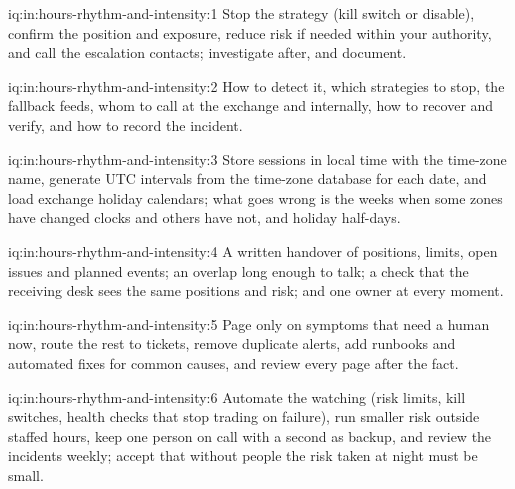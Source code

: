\begin{solution}{iq:in:hours-rhythm-and-intensity:1}
Stop the strategy (kill switch or disable), confirm the position and exposure, reduce risk if needed within your
authority, and call the escalation contacts; investigate after, and document.
\end{solution}

\begin{solution}{iq:in:hours-rhythm-and-intensity:2}
How to detect it, which strategies to stop, the fallback feeds, whom to call at the exchange and internally, how to
recover and verify, and how to record the incident.
\end{solution}

\begin{solution}{iq:in:hours-rhythm-and-intensity:3}
Store sessions in local time with the time-zone name, generate UTC intervals from the time-zone database for each date,
and load exchange holiday calendars; what goes wrong is the weeks when some zones have changed clocks and others have not,
and holiday half-days.
\end{solution}

\begin{solution}{iq:in:hours-rhythm-and-intensity:4}
A written handover of positions, limits, open issues and planned events; an overlap long enough to talk; a check that the
receiving desk sees the same positions and risk; and one owner at every moment.
\end{solution}

\begin{solution}{iq:in:hours-rhythm-and-intensity:5}
Page only on symptoms that need a human now, route the rest to tickets, remove duplicate alerts, add runbooks and
automated fixes for common causes, and review every page after the fact.
\end{solution}

\begin{solution}{iq:in:hours-rhythm-and-intensity:6}
Automate the watching (risk limits, kill switches, health checks that stop trading on failure), run smaller risk outside
staffed hours, keep one person on call with a second as backup, and review the incidents weekly; accept that without
people the risk taken at night must be small.
\end{solution}
